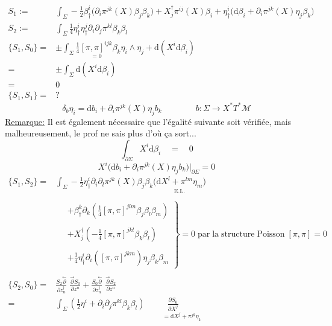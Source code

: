 \documentclass[a4paper,11pt]{article}
\renewcommand{\d}{{\mathrm{d}}}
\newcommand{\dr}[2]{\frac{\partial {#1}}{\partial{#2}}}
\begin{document}
\begin{align*}
S_1 :=& \int_\Sigma - \frac12 \beta^i_\dag \Big( \partial_i \pi^{jk}(X)\beta_j \beta_k\Big) + X_j^\dag \pi^{ij}(X)\beta_i + \eta^i_\dag \Big( \d\beta_i + \partial_i \pi^{jk}(X)\eta_j\beta_k\Big)\\
S_2 :=& \int_\Sigma \frac14 \eta^i_\dag \eta^j_\dag \partial_i\partial_j\pi^{kl}\beta_k\beta_l\\
\{S_1,S_0\} =& \pm \int_\Sigma \frac14 \underset{=0}{[\pi,\pi]^{ijk}}\beta_k \eta_i\wedge\eta_j + \d(X^i\d \beta_i)\\
=& \pm \int_\Sigma \d(X^i\d \beta_i)\\
=& 0\\
\{S_1,S_1\} =& ?
\end{align*}
$$\delta_b \eta_i = \d b_i + \partial_i \pi^{jk}(X)\eta_j b_k \quad\quad\quad\quad b: \Sigma\to X^*T^*\mathcal{M}$$
\underline{Remarque:} Il est également nécessaire que l'égalité suivante soit vérifiée, mais malheureusement, le prof ne sais plus d'où ça sort...
$$\int_{\partial\Sigma} X^i\d \beta_i \quad = \quad 0$$
$$X^i\Big(\d b_i + \partial_i \pi^{jk}(X)\eta_jb_k\Big)\bigg|_{\partial\Sigma} = 0$$
\begin{align*}
\{S_1,S_2\} =& \int_\Sigma -\frac12 \eta^i_\dag \partial_i\partial_l \pi^{jk}(X) \beta_j\beta_k \Big(\underset{\mathrm{E}.\mathrm{L}.}{\d X^l + \pi^{lm}\eta_m}\Big)\\\\
&\quad \left.\begin{array}{l}
+ \beta^k_\dag \partial_k (\frac14 [\pi,\pi]^{jlm} \beta_j\beta_l\beta_m)\\\\
+ X^\dag_j (-\frac14 [\pi,\pi]^{jkl}\beta_k\beta_l)\\\\
+ \frac14\eta^i_\dag \partial_i \left([\pi,\pi]^{jkm}\right)\eta_j\beta_k\beta_m
\end{array}\right\} = 0 \; \mathrm{par}\;\mathrm{la}\;\mathrm{structure}\;\mathrm{Poisson}\; [\pi,\pi]=0\\\\
\{S_2,S_0\} =& \frac{S_2\overset\leftarrow\partial}{\partial z_n^\dag}\;\frac{\overset\to\partial S_0}{\partial z^n} + \frac{S_0\overset\leftarrow\partial}{\partial z_n^\dag}\;\frac{\overset\to\partial S_2}{\partial z^n}\\
=& \int_\Sigma \left(\frac12 \eta^i + \partial_i\partial_j \pi^{kl} \beta_k\beta_l\right)\!\!\!\!\!\!\!\!\!\!\!\!\!\!\!\!\!\! \underset{\quad\quad\quad=\d X^j + \pi^{jk} \eta_k}{\dr{S_0}{X^j}}
\end{align*}
\end{document}
